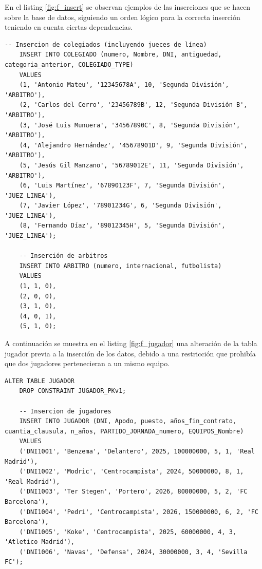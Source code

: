 \documentclass{article}
\begin{document}
En el listing \ref{fig:f_insert} se observan ejemplos de las inserciones que se hacen sobre la base de datos, siguiendo un orden lógico para la correcta inserción teniendo en cuenta ciertas dependencias.
\\
\begin{lstlisting}[style=sqlstyle, label=fig:f_insert,caption=Carga de datos]
	-- Insercion de colegiados (incluyendo jueces de línea)
	INSERT INTO COLEGIADO (numero, Nombre, DNI, antiguedad, categoria_anterior, COLEGIADO_TYPE) 
	VALUES 
	(1, 'Antonio Mateu', '12345678A', 10, 'Segunda División', 'ARBITRO'),
	(2, 'Carlos del Cerro', '23456789B', 12, 'Segunda División B', 'ARBITRO'),
	(3, 'José Luis Munuera', '34567890C', 8, 'Segunda División', 'ARBITRO'),
	(4, 'Alejandro Hernández', '45678901D', 9, 'Segunda División', 'ARBITRO'),
	(5, 'Jesús Gil Manzano', '56789012E', 11, 'Segunda División', 'ARBITRO'),
	(6, 'Luis Martínez', '67890123F', 7, 'Segunda División', 'JUEZ_LINEA'),  
	(7, 'Javier López', '78901234G', 6, 'Segunda División', 'JUEZ_LINEA'),  
	(8, 'Fernando Díaz', '89012345H', 5, 'Segunda División', 'JUEZ_LINEA');  
	
	-- Inserción de arbitros
	INSERT INTO ARBITRO (numero, internacional, futbolista) 
	VALUES 
	(1, 1, 0),
	(2, 0, 0),
	(3, 1, 0),
	(4, 0, 1),
	(5, 1, 0);
\end{lstlisting}

\newpage
A continuación se muestra en el listing \ref{fig:f_jugador} una alteración de la tabla jugador previa a la inserción de los datos, debido a una restricción que prohibía que dos jugadores pertenecieran a un mismo equipo.
\\

\begin{lstlisting}[style=sqlstyle, label=fig:f_jugador,caption=Corrección de restricción]
	ALTER TABLE JUGADOR
	DROP CONSTRAINT JUGADOR_PKv1;
	
	-- Insercion de jugadores
	INSERT INTO JUGADOR (DNI, Apodo, puesto, años_fin_contrato, cuantia_clausula, n_años, PARTIDO_JORNADA_numero, EQUIPOS_Nombre) 
	VALUES 
	('DNI1001', 'Benzema', 'Delantero', 2025, 100000000, 5, 1, 'Real Madrid'),
	('DNI1002', 'Modric', 'Centrocampista', 2024, 50000000, 8, 1, 'Real Madrid'),
	('DNI1003', 'Ter Stegen', 'Portero', 2026, 80000000, 5, 2, 'FC Barcelona'),
	('DNI1004', 'Pedri', 'Centrocampista', 2026, 150000000, 6, 2, 'FC Barcelona'),
	('DNI1005', 'Koke', 'Centrocampista', 2025, 60000000, 4, 3, 'Atletico Madrid'),
	('DNI1006', 'Navas', 'Defensa', 2024, 30000000, 3, 4, 'Sevilla FC');
	
\end{lstlisting}
\end{document}

